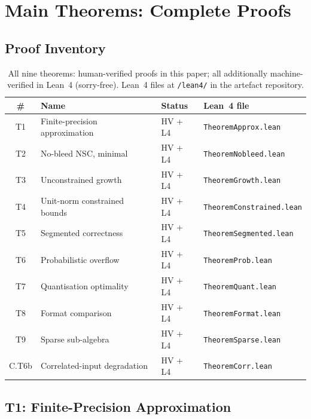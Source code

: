 \documentclass[11pt,a4paper]{article}
\theoremstyle{definition}
\theoremstyle{plain}
\theoremstyle{remark}
\begin{document}
\section{Main Theorems: Complete Proofs}
\label{sec:main}

\subsection{Proof Inventory}

\begin{table}[h]
\centering
\caption{All nine theorems: human-verified proofs in this paper;
all additionally machine-verified in Lean~4 (sorry-free).
Lean~4 files at \texttt{/lean4/} in the artefact repository.}
\label{tab:proof-status}
\small
\begin{tabular}{clll}
\toprule
\# & Name & Status & Lean~4 file \\
\midrule
T1 & Finite-precision approximation & HV + L4 & \texttt{TheoremApprox.lean} \\
T2 & No-bleed NSC, minimal & HV + L4 & \texttt{TheoremNobleed.lean} \\
T3 & Unconstrained growth & HV + L4 & \texttt{TheoremGrowth.lean} \\
T4 & Unit-norm constrained bounds & HV + L4 & \texttt{TheoremConstrained.lean} \\
T5 & Segmented correctness & HV + L4 & \texttt{TheoremSegmented.lean} \\
T6 & Probabilistic overflow & HV + L4 & \texttt{TheoremProb.lean} \\
T7 & Quantisation optimality & HV + L4 & \texttt{TheoremQuant.lean} \\
T8 & Format comparison & HV + L4 & \texttt{TheoremFormat.lean} \\
T9 & Sparse sub-algebra & HV + L4 & \texttt{TheoremSparse.lean} \\
\midrule
C.T6b & Correlated-input degradation & HV + L4 & \texttt{TheoremCorr.lean} \\
\bottomrule
\end{tabular}
\end{table}

\subsection{T1: Finite-Precision Approximation}
\label{sec:approx}
\end{document}
